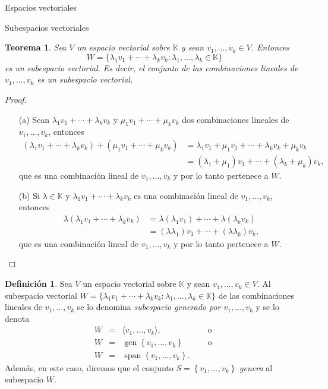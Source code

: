 \documentclass[a4paper,12pt,twoside,spanish]{amsbook}
\newtheorem{teorema}{Teorema}[section]
\theoremstyle{definition}
\newtheorem{definicion}{Definici\'on}[section]
\theoremstyle{remark}
\newcommand{\K}{\mathbb K}
\begin{document}
\begin{chapter}{Espacios vectoriales}
\begin{section}{Subespacios vectoriales}
	\begin{teorema}
	Sea $V$ un espacio vectorial sobre $\K$ y sean $v_1,\ldots,v_k \in V$. Entonces
	$$
	W = \{\lambda_1v_1+\cdots+\lambda_kv_k: \lambda_1,\ldots,\lambda_k \in \K \}
	$$
	es un subespacio vectorial. Es decir,  el conjunto de las combinaciones lineales de $v_1,\ldots,v_k$ es un subespacio vectorial.
	\end{teorema}
	\begin{proof}
		\begin{enumerate}
			\item[(a)] Sean $\lambda_1v_1+\cdots+\lambda_kv_k$ y $\mu_1v_1+\cdots+\mu_kv_k$ dos combinaciones lineales de $v_1,\ldots,v_k$, entonces 
			\begin{align*}
				(\lambda_1v_1+\cdots+\lambda_kv_k)+(\mu_1v_1+\cdots+\mu_kv_k) &=  \lambda_1v_1+\mu_1v_1+\cdots+\lambda_kv_k+\mu_kv_k\\
				&= (\lambda_1+\mu_1)v_1+\cdots+(\lambda_k+\mu_k)v_k,
			\end{align*}
			que es  una combinación lineal de  $v_1,\ldots,v_k$ y por lo tanto pertenece a $W$.
			\item[(b)] Si $\lambda \in \K$ y $\lambda_1v_1+\cdots+\lambda_kv_k$  es una combinación lineal de $v_1,\ldots,v_k$,  entonces
			\begin{align*}
			\lambda (\lambda_1v_1+\cdots+\lambda_kv_k) &=  \lambda(\lambda_1v_1)+\cdots+\lambda(\lambda_kv_k)\\
			&= (\lambda\lambda_1)v_1+\cdots+(\lambda\lambda_k)v_k,
			\end{align*}
				que es  una combinación lineal de  $v_1,\ldots,v_k$ y por lo tanto pertenece a $W$.
		\end{enumerate}
	\end{proof}
	


	\begin{definicion}
	Sea $V$ un espacio vectorial sobre $\K$ y sean $v_1,\ldots,v_k \in V$. Al  subespacio vectorial $	W = \{\lambda_1v_1+\cdots+\lambda_kv_k: \lambda_1,\ldots,\lambda_k \in \K \}$ de las combinaciones lineales de $v_1,\ldots,v_k$ se lo denomina \textit{subespacio generado por $v_1,\ldots,v_k$} y se lo denota  
	\begin{equation*}
		\begin{array}{rcll}
		W &=& \langle v_1,\ldots,v_k \rangle, &\quad \text{ o } \\
		W &=&  \operatorname{gen}\left\{ v_1,\ldots,v_k\right\} &\quad \text{ o } \\
		W &=&  \operatorname{span}\left\{ v_1,\ldots,v_k\right\}.&
		\end{array}
	\end{equation*}
	Además, en este caso, diremos que el conjunto $S = \left\{ v_1,\ldots,v_k \right\}$ \textit{genera} al subespacio $W$.
	

\end{definicion}
\end{section}
\end{chapter}
\end{document}
